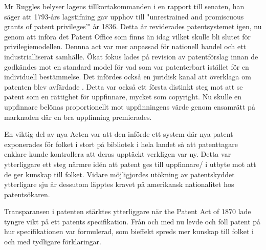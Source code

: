 
Mr Ruggles belyser lagens tillkortakommanden i en rapport till senaten, han säger att 1793-års lagstifning gav upphov till "unrestrained and promiscuous grants of patent privileges’" \cite{ruggles} år 1836. 
Detta år reviderades patentsystemet igen, nu genom att införa det Patent
Office som finns än idag\cite{nard} vilket skulle bli slutet för privilegiemodellen\cite{bracha}. Dennna act var mer anpassad för nationell handel och ett industrialliserat samhälle. Ökat fokus lades på revision av patentförslag innan
de godkändes mot en standard model för vad som var patenterbart istället för en individuell bestämmelse\cite{bracha}. Det infördes också en juridisk kanal att överklaga om patenten blev avfärdade \cite{nard}. Detta var också ett första distinkt steg mot att se patent som en rättighet för uppfinnare, mycket som copyright\cite{bracha}. Nu skulle en uppfinnare belönas proportionellt mot uppfinningens värde genom ensamrätt på marknaden där en bra uppfinning premierades.


En viktig del av nya Acten var att den införde ett system där nya patent exponerades för folket i stort
på bibliotek i hela landet så att patenttagare enklare kunde kontrollera att deras upptäckt verkligen
var ny\cite{watson}. Detta var ytterliggare ett steg närmre idén att patent ges till uppfinnare/ i
utbyte mot att de ger kunskap till folket. Vidare möjligjordes utökning av patentskyddet ytterligare sju
år \cite{watson} dessutom läpptes kravet på amerikansk nationalitet hos patentsökaren.

Transparansen i patenten stärktes ytterliggare när the Patent Act of 1870 lade tyngre vikt på ett
patents specifikation. Från och med nu levde och föll patent på hur specifikationen var formulerad, som
bieffekt spreds mer kunskap till folket i och med tydligare förklaringar\cite{nard}.
